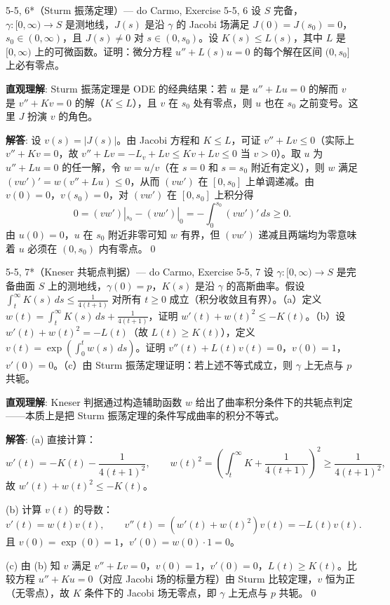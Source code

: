 \begin{exercise}{5-5, 6*（Sturm 振荡定理）— do Carmo, Exercise 5-5, 6}
设 $S$ 完备，$\gamma: [0, \infty) \to S$ 是测地线，$J(s)$ 是沿 $\gamma$ 的 Jacobi 场满足 $J(0)=J(s_0)=0$，$s_0\in(0,\infty)$，且 $J(s)\neq 0$ 对 $s\in(0,s_0)$。设 $K(s)\leq L(s)$，其中 $L$ 是 $[0,\infty)$ 上的可微函数。证明：微分方程 $u''+L(s)u=0$ 的每个解在区间 $(0,s_0]$ 上必有零点。
\end{exercise}
\begin{solution}
\textbf{直观理解}: Sturm 振荡定理是 ODE 的经典结果：若 $u$ 是 $u''+Lu=0$ 的解而 $v$ 是 $v''+Kv=0$ 的解（$K\leq L$），且 $v$ 在 $s_0$ 处有零点，则 $u$ 也在 $s_0$ 之前变号。这里 $J$ 扮演 $v$ 的角色。

\textbf{解答}: 设 $v(s)=|J(s)|$。由 Jacobi 方程和 $K\leq L$，可证 $v''+Lv\leq 0$（实际上 $v''+Kv=0$，故 $v''+Lv = -L_v + Lv \leq Kv + Lv \leq 0$ 当 $v>0$）。取 $u$ 为 $u''+Lu=0$ 的任一解，令 $w=u/v$（在 $s=0$ 和 $s=s_0$ 附近有定义），则 $w$ 满足 $(vw')'=w(v''+Lu)\leq 0$，从而 $(vw')$ 在 $[0,s_0]$ 上单调递减。由 $v(0)=0$，$v(s_0)=0$，对 $(vw')$ 在 $[0,s_0]$ 上积分得
\[
0 = (vw')|_{s_0} - (vw')|_{0} = -\int_0^{s_0}(vw')'\,ds \geq 0.
\]
由 $u(0)=0$，$u$ 在 $s_0$ 附近非零可知 $w$ 有界，但 $(vw')$ 递减且两端均为零意味着 $u$ 必须在 $(0,s_0)$ 内有零点。\qed
\end{solution}

\begin{exercise}{5-5, 7*（Kneser 共轭点判据）— do Carmo, Exercise 5-5, 7}
设 $\gamma: [0, \infty) \to S$ 是完备曲面 $S$ 上的测地线，$\gamma(0)=p$，$K(s)$ 是沿 $\gamma$ 的高斯曲率。假设 $\int_t^\infty K(s)\,ds \leq \frac{1}{4(t+1)}$ 对所有 $t\geq 0$ 成立（积分收敛且有界）。（a）定义 $w(t) = \int_t^\infty K(s)\,ds + \frac{1}{4(t+1)}$，证明 $w'(t)+w(t)^2 \leq -K(t)$。（b）设 $w'(t)+w(t)^2 = -L(t)$（故 $L(t)\geq K(t)$），定义 $v(t) = \exp(\int_0^t w(s)\,ds)$。证明 $v''(t)+L(t)v(t)=0$，$v(0)=1$，$v'(0)=0$。（c）由 Sturm 振荡定理证明：若上述不等式成立，则 $\gamma$ 上无点与 $p$ 共轭。
\end{exercise}
\begin{solution}
\textbf{直观理解}: Kneser 判据通过构造辅助函数 $w$ 给出了曲率积分条件下的共轭点判定——本质上是把 Sturm 振荡定理的条件写成曲率的积分不等式。

\textbf{解答}: (a) 直接计算：
\[
w'(t) = -\!K(t) - \frac{1}{4(t+1)^2},\qquad
w(t)^2 = \left(\int_t^\infty K + \frac{1}{4(t+1)}\right)^2 \geq \frac{1}{4(t+1)^2},
\]
故 $w'(t)+w(t)^2 \leq -K(t)$。

(b) 计算 $v(t)$ 的导数：
\[
v'(t)=w(t)v(t),\qquad v''(t)=(w'(t)+w(t)^2)v(t)=-L(t)v(t).
\]
且 $v(0)=\exp(0)=1$，$v'(0)=w(0)\cdot 1=0$。

(c) 由 (b) 知 $v$ 满足 $v''+Lv=0$，$v(0)=1$，$v'(0)=0$，$L(t)\geq K(t)$。比较方程 $u''+Ku=0$（对应 Jacobi 场的标量方程）由 Sturm 比较定理，$v$ 恒为正（无零点），故 $K$ 条件下的 Jacobi 场无零点，即 $\gamma$ 上无点与 $p$ 共轭。\qed
\end{solution}

